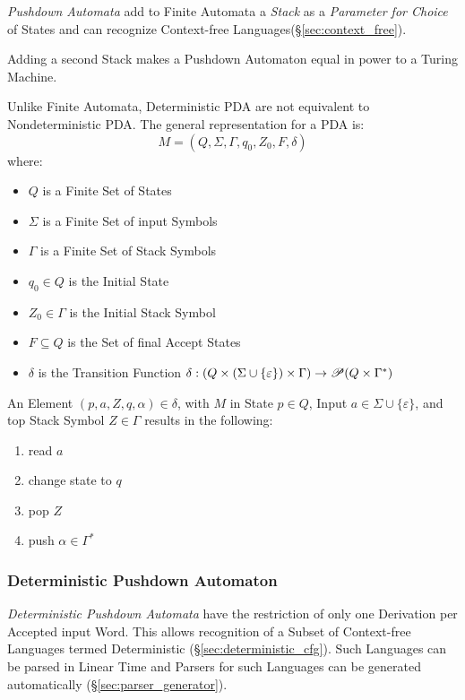 \emph{Pushdown Automata} add to Finite Automata a \emph{Stack} as a
\emph{Parameter for Choice} of States and can recognize Context-free
Languages(\S\ref{sec:context_free}).

Adding a second Stack makes a Pushdown Automaton equal in power to a
Turing Machine.

Unlike Finite Automata, Deterministic PDA are not equivalent to
Nondeterministic PDA. The general representation for a PDA is:
\[
  M = (Q, \Sigma, \Gamma, q_0, Z_0, F, \delta)
\]
where:
\begin{itemize}
  \item $Q$ is a Finite Set of States
  \item $\Sigma$ is a Finite Set of input Symbols
  \item $\Gamma$ is a Finite Set of Stack Symbols
  \item $q_0 \in Q$ is the Initial State
  \item $Z_0 \in \Gamma$ is the Initial Stack Symbol
  \item $F \subseteq Q$ is the Set of final Accept States
  \item $\delta$ is the Transition Function $\delta: (Q \times (\Sigma
    \cup \{\varepsilon\}) \times \Gamma) \rightarrow \mathscr{P}(Q \times
    \Gamma^*)$
\end{itemize}

An Element $(p,a,Z,q,\alpha)\in\delta$, with $M$ in State $p \in Q$,
Input $a \in \Sigma \cup \{\varepsilon\}$, and top Stack Symbol $Z \in
\Gamma$ results in the following:
\begin{enumerate}
  \item read $a$
  \item change state to $q$
  \item pop $Z$
  \item push $\alpha \in \Gamma^*$
\end{enumerate}



\subsubsection{Deterministic Pushdown Automaton}
\label{sec:deterministic_pda}

\emph{Deterministic Pushdown Automata} have the restriction of only
one Derivation per Accepted input Word. This allows recognition of a
Subset of Context-free Languages termed Deterministic
(\S\ref{sec:deterministic_cfg}). Such Languages can be parsed in
Linear Time and Parsers for such Languages can be generated
automatically (\S\ref{sec:parser_generator}).

